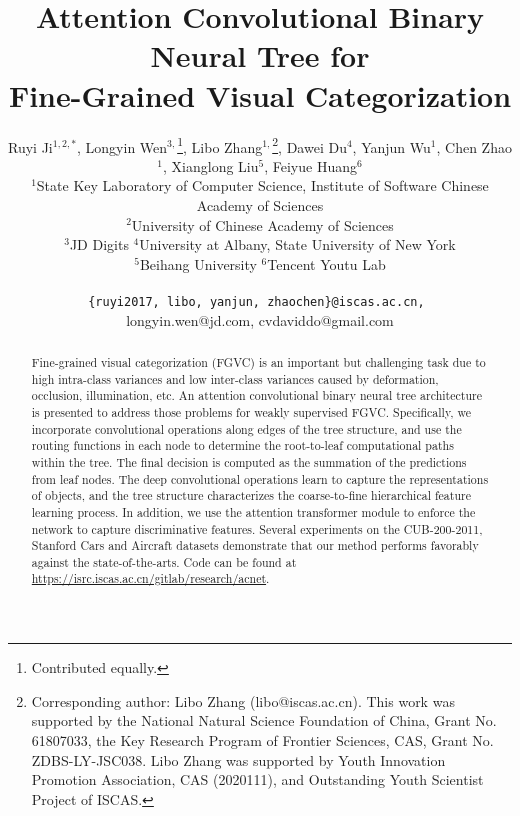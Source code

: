 \documentclass[10pt,twocolumn,letterpaper]{article}
\begin{document}
	
\title{Attention Convolutional Binary Neural Tree for \\ Fine-Grained Visual Categorization}

\author{Ruyi Ji$^{1,2,\ast}$, Longyin Wen$^{3,}$\thanks{Contributed equally.}, Libo Zhang$^{1,}$\thanks{Corresponding author: Libo Zhang (libo@iscas.ac.cn). This work was supported by the National Natural Science Foundation of China, Grant No. 61807033, the Key Research Program of Frontier Sciences, CAS, Grant No. ZDBS-LY-JSC038. Libo Zhang was supported by Youth Innovation Promotion Association, CAS (2020111), and Outstanding Youth Scientist Project of ISCAS.}, Dawei Du$^{4}$, \authorcr Yanjun Wu$^1$, Chen Zhao$^1$, Xianglong Liu$^5$, Feiyue Huang$^6$\\
$^1$State Key Laboratory of Computer Science, Institute of Software Chinese Academy of Sciences\\$^2$University of Chinese Academy of Sciences\\$^3$JD Digits \quad $^4$University at Albany, State University of New York\\$^5$Beihang University \quad $^6$Tencent Youtu Lab\\{\tt\small \{ruyi2017, libo, yanjun, zhaochen\}@iscas.ac.cn, \par longyin.wen@jd.com, cvdaviddo@gmail.com}}


\maketitle


\begin{abstract}
Fine-grained visual categorization (FGVC) is an important but challenging task due to high intra-class variances and low inter-class variances caused by deformation, occlusion, illumination, etc. An attention convolutional binary neural tree architecture is presented to address those problems for weakly supervised FGVC. Specifically, we incorporate convolutional operations along edges of the tree structure, and use the routing functions in each node to determine the root-to-leaf computational paths within the tree. The final decision is computed as the summation of the predictions from leaf nodes. The deep convolutional operations learn to capture the representations of objects, and the tree structure characterizes the coarse-to-fine hierarchical feature learning process. In addition, we use the attention transformer module to enforce the network to capture discriminative features. Several experiments on the CUB-200-2011, Stanford Cars and Aircraft datasets demonstrate that our method performs favorably against the state-of-the-arts. Code can be found
at \url{https://isrc.iscas.ac.cn/gitlab/research/acnet}.
\end{abstract}
\end{document}

